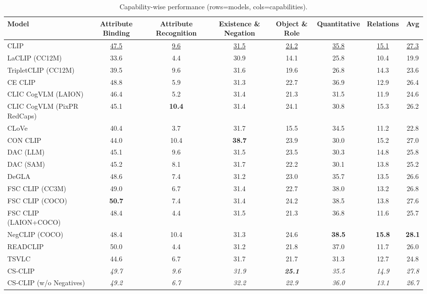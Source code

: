 \begin{table}[t]
  \centering
  \scriptsize
  \caption{Capability-wise performance (rows=models, cols=capabilities).}
  \label{tab:caps_models_rows}
  \begin{adjustbox}{max width=\textwidth}
  \setlength{\tabcolsep}{2pt}
  \begin{tabular}{p{5.0cm}ccccccc}
    \toprule
    Model & Attribute Binding & Attribute Recognition & Existence \& Negation & Object \& Role & Quantitative & Relations & Avg \\
    \midrule
    CLIP & \underline{47.5} & \underline{9.6} & \underline{31.5} & \underline{24.2} & \underline{35.8} & \underline{15.1} & \underline{27.3} \\
    \midrule
    LaCLIP (CC12M) & 33.6 & 4.4 & 30.9 & 14.1 & 25.8 & 10.4 & 19.9 \\
    TripletCLIP (CC12M) & 39.5 & 9.6 & 31.6 & 19.6 & 26.8 & 14.3 & 23.6 \\
    \midrule
    CE CLIP & 48.8 & 5.9 & 31.3 & 22.7 & 36.9 & 12.9 & 26.4 \\
    CLIC CogVLM (LAION) & 46.4 & 5.2 & 31.4 & 21.3 & 31.5 & 11.9 & 24.6 \\
    CLIC CogVLM (PixPR RedCaps) & 45.1 & \textbf{10.4} & 31.4 & 24.1 & 30.8 & 15.3 & 26.2 \\
    CLoVe & 40.4 & 3.7 & 31.7 & 15.5 & 34.5 & 11.2 & 22.8 \\
    CON CLIP & 44.0 & 10.4 & \textbf{38.7} & 23.9 & 30.0 & 15.2 & 27.0 \\
    DAC (LLM) & 45.1 & 9.6 & 31.5 & 23.5 & 30.3 & 14.8 & 25.8 \\
    DAC (SAM) & 45.2 & 8.1 & 31.7 & 22.2 & 30.1 & 13.8 & 25.2 \\
    DeGLA & 48.6 & 7.4 & 31.2 & 23.0 & 35.7 & 13.5 & 26.6 \\
    FSC CLIP (CC3M) & 49.0 & 6.7 & 31.4 & 22.7 & 38.0 & 13.2 & 26.8 \\
    FSC CLIP (COCO) & \textbf{50.7} & 7.4 & 31.4 & 24.2 & 38.5 & 13.8 & 27.6 \\
    FSC CLIP (LAION+COCO) & 48.4 & 4.4 & 31.5 & 21.3 & 36.8 & 11.6 & 25.7 \\
    NegCLIP (COCO) & 48.4 & 10.4 & 31.3 & 24.6 & \textbf{38.5} & \textbf{15.8} & \textbf{28.1} \\
    READCLIP & 50.0 & 4.4 & 31.2 & 21.8 & 37.0 & 11.7 & 26.0 \\
    TSVLC & 44.6 & 6.7 & 31.7 & 21.7 & 31.3 & 12.7 & 24.8 \\
    \midrule
    CS-CLIP & \emph{49.7} & \emph{9.6} & \emph{31.9} & \textbf{\emph{25.1}} & \emph{35.5} & \emph{14.9} & \emph{27.8} \\
    CS-CLIP (w/o Negatives) & \emph{49.2} & \emph{6.7} & \emph{32.2} & \emph{22.9} & \emph{36.0} & \emph{13.1} & \emph{26.7} \\
    \bottomrule
  \end{tabular}
  \end{adjustbox}
\end{table}

